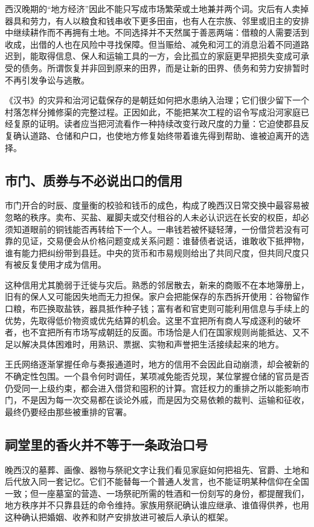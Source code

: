 西汉晚期的“地方经济”因此不能只写成市场繁荣或土地兼并两个词。灾后有人卖掉器具和劳力，有人以粮食和钱串收下更多田亩，也有人在宗族、邻里或旧主的安排中继续耕作而不再拥有土地。不同选择并不天然属于善恶两端：借粮的人需要活到收成，出借的人也在风险中寻找保障。但当赈给、减免和河工的消息沿着不同道路迟到，能取得信息、保人和运输工具的一方，会比孤立的家庭更早把损失变成可承受的债务。所谓恢复并非回到原来的田界，而是让新的田界、债务和劳力安排暂时不再引发争讼与逃散。

《汉书》的灾异和治河记载保存的是朝廷如何把水患纳入治理；它们很少留下一个村落怎样分摊修渠的完整过程。正因如此，不能把某次工程的诏令写成沿河家庭已经复原的证明。读者应当把河流看作一种持续改变行政尺度的力量：它迫使郡县反复确认道路、仓储和户口，也使地方修复始终带着谁先得到帮助、谁被迫离开的选择。

\subsection{市门、质券与不必说出口的信用}

市门开合的时辰、度量衡的校验和钱币的成色，构成了晚西汉日常交换中最容易被忽略的秩序。卖布、买盐、雇脚夫或交付租谷的人未必认识远在长安的权臣，却必须知道眼前的铜钱能否再转给下一个人。一串钱若被怀疑轻薄，一份借贷若没有可靠的见证，交易便会从价格问题变成关系问题：谁替债者说话，谁敢收下抵押物，谁有能力把纠纷带到县廷。中央的货币和市易规则给出了共同尺度，但共同尺度只有被反复使用才成为信用。

这种信用尤其脆弱于迁徙与灾后。熟悉的邻居散去，新来的商贩不在本地簿册上，旧有的保人又可能因失地而无力担保。家户会把能保存的东西拆开使用：谷物留作口粮，布匹换取盐铁，器具抵作种子钱；富有者和官吏则可能利用信息与手续上的优势，先取得低价物资或优先结算的机会。这里不宜把所有商人写成逐利的破坏者，也不宜把所有市场写成朝廷的反面。市场恰是人们在国家规则尚能抵达、又不足以解决具体困难时，用熟识、票据、实物和声誉把生活接续起来的地方。

王氏网络逐渐掌握任命与奏报通道时，地方的信用不会因此自动崩溃，却会被新的不确定性包围。一个县令何时调任，某项减免能否兑现，某位掌握仓储的官员是否仍受同一上级约束，都会进入借贷和囤积的计算。宫廷权力的重排之所以能影响市门，不是因为每一次交易都在谈论外戚，而是因为交易依赖的裁判、运输和征收，最终仍要经由那些被重排的官署。

\subsection{祠堂里的香火并不等于一条政治口号}

晚西汉的墓葬、画像、器物与祭祀文字让我们看见家庭如何把祖先、官爵、土地和后代放入同一套记忆。它们不能替每一个普通人发言，也不能证明某种信仰在全国一致；但一座墓室的营造、一场祭祀所需的牲酒和一份刻写的身份，都提醒我们，地方秩序并不只靠县廷的命令维持。家族用祭祀确认谁应继承、谁值得供养，也用这种确认把婚姻、收养和财产安排放进可被后人承认的框架。

